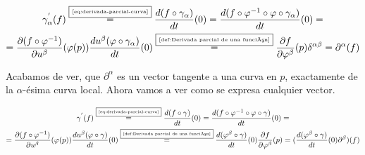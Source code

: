 \begin{multline}
\gamma_\alpha^{'}(f)\overset{\fbox{\tiny \ref{eq:derivada-parcial-curva}}}{=}
  \frac{d(f\circ\gamma_\alpha)}{dt}(0)=
  \frac{d(f\circ\varphi^{-1}\circ\varphi\circ\gamma_\alpha)}{dt}(0)=\\
  =\frac{\partial(f\circ\varphi^{-1})}{\partial u^\beta}(\varphi(p))
  \frac{d u^\beta(\varphi\circ\gamma_\alpha)}{dt}(0)\overset{\fbox{\tiny \ref{def:Derivada parcial de una función}}}{=}
  \frac{\partial f}{\partial \varphi^\beta}(p)\delta^{\alpha\beta}
=\partial^\alpha(f)
\end{multline}

Acabamos de ver, que $\partial^\alpha$ es un vector tangente a una curva en $p$, exactamente de la $\alpha$-ésima
curva local.
Ahora vamos a ver como se expresa cualquier vector.

\begin{multline}\label{eq:imagen-vector-funcion}
  \gamma^{'}(f)\overset{\fbox{\tiny \ref{eq:derivada-parcial-curva}}}{=}
  \frac{d(f\circ\gamma)}{dt}(0)=
  \frac{d(f\circ\varphi^{-1}\circ\varphi\circ\gamma)}{dt}(0)=\\
  =\frac{\partial(f\circ\varphi^{-1})}{\partial u^\beta}(\varphi(p))
  \frac{d u^\beta(\varphi\circ\gamma)}{dt}(0)\overset{\fbox{\tiny \ref{def:Derivada parcial de una función}}}{=}
  \frac{d(\varphi^\beta\circ\gamma)}{dt}(0)\frac{\partial f}{\partial \varphi^\beta}(p)
  =(\frac{d(\varphi^\beta\circ\gamma)}{dt}(0)\partial^\beta)(f)
\end{multline}
